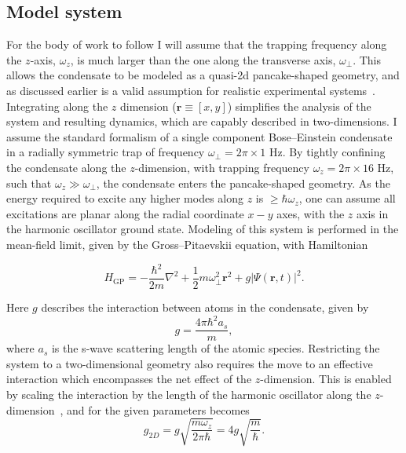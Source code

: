 \subsection{Model system}\label{sec:modelsystem}

For the body of work to follow I will assume that the trapping frequency along the $z$-axis, $\omega_z$, is much larger than the one along the transverse axis, $\omega_\perp$. This allows the condensate to be modeled as a quasi-2d pancake-shaped geometry, and as discussed earlier is a valid assumption for realistic experimental systems~\cite{BEC:Fetter_revmodphys_2009}. Integrating along the $z$ dimension ($\textbf{r}\equiv [x,y]$) simplifies the analysis of the system and resulting dynamics, which are capably described in two-dimensions. I assume the standard formalism of a single component Bose--Einstein condensate in a radially symmetric trap of frequency $\omega_\perp = 2\pi \times 1$ Hz. By tightly confining the condensate along the $z$-dimension, with trapping frequency $\omega_z = 2\pi\times 16$ Hz, such that $\omega_z \gg \omega_\perp$, the condensate enters the pancake-shaped geometry. As the energy required to excite any higher modes along $z$ is $\geq \hbar\omega_z$, one can assume all excitations are planar along the radial coordinate $x-y$ axes, with the $z$ axis in the harmonic oscillator ground state. Modeling of this system is performed in the mean-field limit, given by the Gross--Pitaevskii equation, with Hamiltonian


\begin{equation}\label{eqn:gpe_h0}
	H_{\mathrm{GP}} = -\frac{\hbar^2}{2m}\nabla^2 + \frac{1}{2}m\omega_{\perp}^2\mathbf{r}^2 + g\vert\Psi(\mathbf{r},t)\vert^2.
\end{equation}

Here $g$ describes the interaction between atoms in the condensate, given by \begin{equation}
g = \frac{4\pi\hbar^2a_s}{m},
\end{equation}
where $a_s$ is the s-wave scattering length of the atomic species. Restricting the system to a two-dimensional geometry also requires the move to an effective interaction which encompasses the net effect of the $z$-dimension. This is enabled by scaling the interaction by the length of the harmonic oscillator along the $z$-dimension~\cite[pg. 456]{BK:Pethick_smith_}, and for the given parameters becomes
\begin{equation}
g_{2D} = g\sqrt{\frac{m\omega_z}{2\pi\hbar}} = 4g \sqrt{\frac{m}{\hbar}}.
\end{equation}

